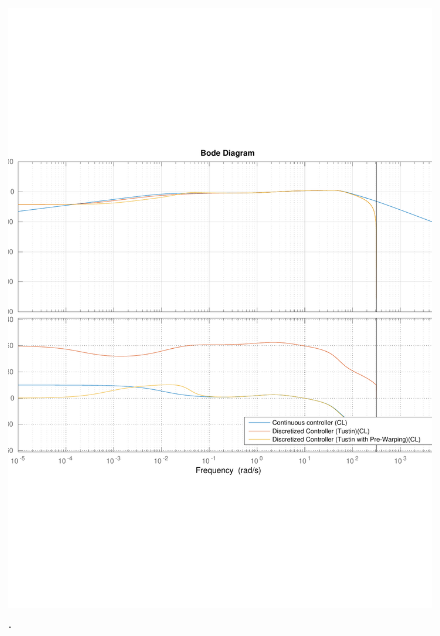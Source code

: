 \begin{minipage}{\linewidth}
\begin{minipage}{0.45\linewidth}
  \end{minipage}
  \hspace{0.03\linewidth}
  \begin{minipage}{0.45\linewidth}
    \begin{figure}[H]
      \includegraphics[scale=.50]{figures/prewarpVsNoPrewarpVsContinuousBodeClosedLoop.pdf}
      \centering
      \captionsetup{justification=centering}
      .
      \label{fig:bodePrewarpVsNoPrewarpVsContinuousClosedLoop}
    \end{figure}\vspace{-5mm}
  \end{minipage}
\end{minipage}

